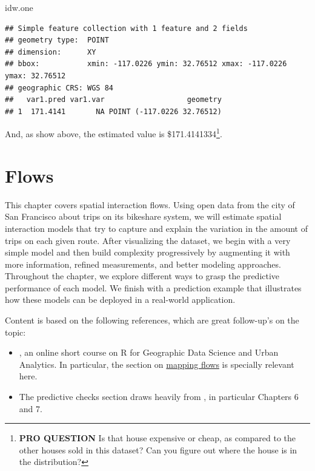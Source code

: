 \documentclass[
]{book}
\newenvironment{Shaded}{\begin{snugshade}}{\end{snugshade}}
\newcommand{\NormalTok}[1]{#1}
\providecommand{\tightlist}{%
  \setlength{\itemsep}{0pt}\setlength{\parskip}{0pt}}
\begin{document}
\begin{Shaded}
\begin{Highlighting}[]
\NormalTok{idw.one}
\end{Highlighting}
\end{Shaded}

\begin{verbatim}
## Simple feature collection with 1 feature and 2 fields
## geometry type:  POINT
## dimension:      XY
## bbox:           xmin: -117.0226 ymin: 32.76512 xmax: -117.0226 ymax: 32.76512
## geographic CRS: WGS 84
##   var1.pred var1.var                   geometry
## 1  171.4141       NA POINT (-117.0226 32.76512)
\end{verbatim}

And, as show above, the estimated value is \$171.4141334\footnote{\textbf{PRO QUESTION} Is that house expensive or cheap, as compared to the other houses sold in this dataset? Can you figure out where the house is in the distribution?}.

\hypertarget{flows}{%
\chapter{Flows}\label{flows}}

This chapter covers spatial interaction flows. Using open data from the city of San Francisco about trips on its bikeshare system, we will estimate spatial interaction models that try to capture and explain the variation in the amount of trips on each given route. After visualizing the dataset, we begin with a very simple model and then build complexity progressively by augmenting it with more information, refined measurements, and better modeling approaches. Throughout the chapter, we explore different ways to grasp the predictive performance of each model. We finish with a prediction example that illustrates how these models can be deployed in a real-world application.

Content is based on the following references, which are great follow-up's on the topic:

\begin{itemize}
\tightlist
\item
  \citet{gds_ua17}, an online short course on R for Geographic Data Science and Urban Analytics. In particular, the section on \href{https://github.com/alexsingleton/GDS_UA_2017/tree/master/Mapping_Flows}{mapping flows} is specially relevant here.
\item
  The predictive checks section draws heavily from \citet{gelman2006data}, in particular Chapters 6 and 7.
\end{itemize}
\end{document}
